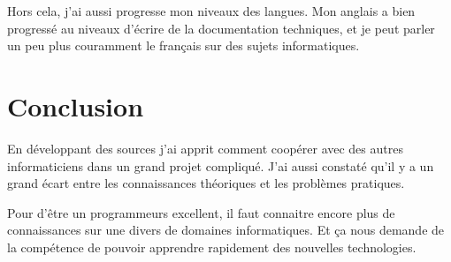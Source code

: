\documentclass[a4paper, 11pt]{article}
\begin{document}



Hors cela, j'ai aussi progresse mon niveaux des langues. Mon anglais a bien
progressé au niveaux d'écrire de la documentation techniques, et je peut parler
un peu plus couramment le français sur des sujets informatiques.

\section{Conclusion}
\label{sec:conclusion}
En développant des sources j'ai apprit comment coopérer avec des autres
informaticiens dans un grand projet compliqué. J'ai aussi constaté qu'il 
y a un grand écart entre les connaissances théoriques et les problèmes pratiques.

Pour d'être un programmeurs excellent, il faut connaitre encore plus de
connaissances sur une divers de domaines informatiques. Et ça nous demande de
la compétence de pouvoir apprendre rapidement des nouvelles technologies.

\end{document}
